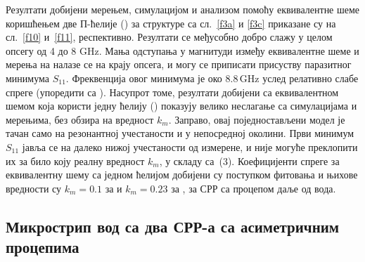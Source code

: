 \documentclass[main.tex]{subfiles}
\begin{document}
Резултати добијени мерењем, симулацијом и анализом помоћу еквивалентне шеме коришћењем две П-ћелије () за структуре са сл.~\ref{f3a} и \ref{f3c} приказане су на сл.~\ref{f10} и~\ref{f11}, респективно. Резултати се међусобно добро слажу у целом опсегу од 4 до 8 GHz. Мања одступања у магнитуди између еквивалентне шеме и мерења на  налазе се на крају опсега, и могу се приписати присуству паразитног минимума $S_{11}$. Фреквенција овог минимума је око $\num{8.8}\,$GHz услед релативно слабе спреге (упоредити са ). Насупрот томе, резултати добијени са еквивалентном шемом која користи једну ћелију () показују велико неслагање са симулацијама и мерењима, без обзира на вредност $k_m$. Заправо, овај поједностављени модел је тачан само на резонантној учестаности и у непосредној околини. Први минимум $S_{11}$ јавља се на далеко нижој учестаности од измерене, и није могуће преклопити их за било коју реалну вредност $k_m$, у складу са~(3). Коефицијенти спреге за еквивалентну шему са једном ћелијом добијени су поступком фитовања и њихове вредности су $k_m=\num{0.1}$ за  и $k_m=\num{0.23}$ за , за СРР са процепом даље од вода.


\subsection{Микрострип вод са два СРР-а са асиметричним процепима}
\end{document}
